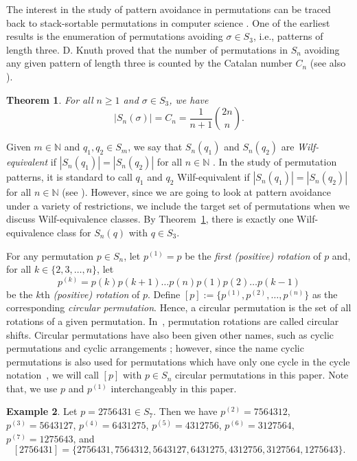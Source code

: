 \documentclass[11pt]{article}
\newtheorem{theorem}{Theorem}[section]
\theoremstyle{definition}
\newtheorem{example}[theorem]{Example}
\numberwithin{equation}{section}
\begin{document}
The interest in the study of 
pattern avoidance in permutations can be traced back to 
stack-sortable permutations in computer science \cite[Section 2.1]{Kitaev2011}. 
One of the earliest results is the enumeration of permutations avoiding $\sigma\in S_3$, 
i.e., patterns of length three. D. Knuth proved that the number 
of permutations in $S_n$ avoiding any given pattern of length three is 
counted by the Catalan number $C_n$
(see also \cite[Theorem 4.7]{Bona2022}).

\begin{theorem} {\rm \cite[p. 238]{Knuth1973}} \label{Theorem:ClassicalSingle3}
For all $n\geq1$ and $\sigma\in S_3$, we have
\[
|S_n(\sigma)|=C_n=\frac{1}{n+1} \binom{2n}{n}.
\]
\end{theorem}

Given $m\in\mathbb{N}$ and $q_1,q_2\in S_m$, we say that $S_n(q_1)$ and $S_n(q_2)$ 
are \textit{Wilf-equivalent} if $|S_n(q_1)|=|S_n(q_2)|$ for all $n\in\mathbb{N}$ . In the study of permutation patterns, it is 
standard to call $q_1$ and $q_2$ Wilf-equivalent if $|S_n(q_1)|=|S_n(q_2)|$ for all $n\in\mathbb{N}$ (see \cite[Chapter 1]{Kitaev2011}). However, since we are going to look at pattern avoidance under a variety of restrictions, we include the target set of permutations when we discuss Wilf-equivalence classes. By Theorem~\ref{Theorem:ClassicalSingle3}, there is exactly one Wilf-equivalence class for $S_n(q)$ with $q\in S_3$.


For any permutation $p\in S_n$, let $p^{(1)}=p$ be the \textit{first (positive) rotation} of $p$ and, for all $k\in\{2,3,\ldots,n\}$, 
let \[p^{(k)}=p(k)p(k+1)\ldots p(n)p(1)p(2)\ldots p(k-1)\] be the $k$th \textit{(positive) 
rotation} of $p$. Define  
$[p]:=\{p^{(1)},p^{(2)},\ldots,p^{(n)}\}
$
as the corresponding \textit{circular permutation}. Hence, a circular permutation is the set of all rotations of a given permutation. In~\cite{GLW2018}, permutation rotations are called circular shifts. Circular permutations have also been given other names, such as cyclic permutations \cite{Li2022} and cyclic arrangements \cite{Vella2003}; however, since the name cyclic permutations is also used for permutations which have only one cycle in the cycle notation~\cite{AE2014, BC2019,Huang2019}, we will call $[p]$ with $p\in S_n$ circular permutations in this paper. Note that, we use $p$ and $p^{(1)}$ interchangeably in this paper.

\begin{example}
    Let $p=2756431\in S_7$. Then we have $p^{(2)}=7564312$, $p^{(3)}=5643127$, $p^{(4)}=6431275$, $p^{(5)}=4312756$, $p^{(6)}=3127564$, $p^{(7)}=1275643$, and \[[2756431]=\{2756431, 7564312, 5643127, 6431275, 4312756, 3127564, 1275643\}.\]
\end{example}
\end{document}
